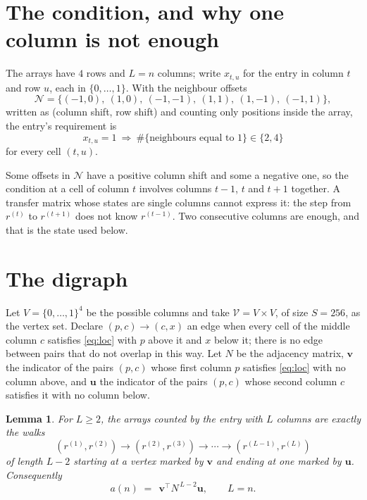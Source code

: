 \documentclass[11pt,a4paper]{article}
\theoremstyle{plain}
\newtheorem{lemma}[theorem]{Lemma}
\theoremstyle{definition}
\begin{document}
\section{The condition, and why one column is not enough}

The arrays have $4$ rows and $L=n$ columns; write $x_{t,u}$ for the entry in
column $t$ and row $u$, each in $\{0,\dots,1\}$. With the neighbour offsets
\[
\mathcal N=\{(-1,0),\ (1,0),\ (-1,-1),\ (1,1),\ (1,-1),\ (-1,1)\},
\]
written as (column shift, row shift) and counting only positions inside the array, the
entry's requirement is
\begin{equation}\label{eq:loc}
x_{t,u}=1\ \Rightarrow\ \#\{\text{neighbours equal to }1\}\in\{2,4\}
\end{equation}
for every cell $(t,u)$.

Some offsets in $\mathcal N$ have a positive column shift and some a negative one, so the
condition at a cell of column $t$ involves columns $t-1$, $t$ and $t+1$ together. A transfer
matrix whose states are single columns cannot express it: the step from $r^{(t)}$ to
$r^{(t+1)}$ does not know $r^{(t-1)}$. Two consecutive columns are enough, and that is
the state used below.

\section{The digraph}

Let $V=\{0,\dots,1\}^{4}$ be the possible columns and take
$\mathcal V=V\times V$, of size $S=256$, as the vertex set. Declare $(p,c)\to(c,x)$ an edge
when every cell of the middle column $c$ satisfies \eqref{eq:loc} with $p$ above it and $x$
below it; there is no edge between pairs that do not overlap in this way. Let $N$ be the
adjacency matrix, $\mathbf{v}$ the indicator of the pairs $(p,c)$ whose first column $p$
satisfies \eqref{eq:loc} with no column above, and $\mathbf{u}$ the indicator of
the pairs $(p,c)$ whose second column $c$ satisfies it with no column below.

\begin{lemma}\label{lem:walk}
For $L\ge2$, the arrays counted by the entry with $L$ columns are exactly the walks
\[
(r^{(1)},r^{(2)})\to(r^{(2)},r^{(3)})\to\cdots\to(r^{(L-1)},r^{(L)})
\]
of length $L-2$ starting at a vertex marked by $\mathbf{v}$ and ending at one marked by
$\mathbf{u}$. Consequently
\[
a(n)\;=\;\,\mathbf{v}^{\!\top}N^{\,L-2}\mathbf{u},\qquad L=n .
\]
\end{lemma}
\end{document}
